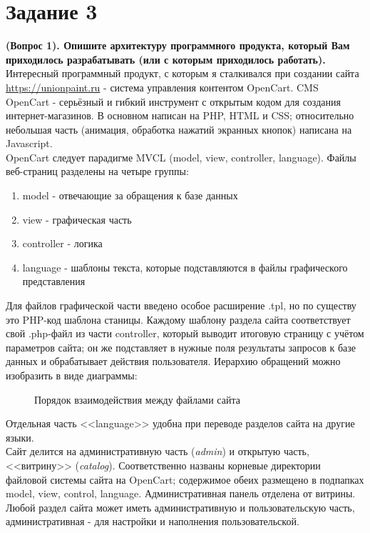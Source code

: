 \documentclass[a4paper,12pt]{article} %
\begin{document}
\section{Задание 3}
\textbf{(Вопрос 1). Опишите архитектуру программного продукта, который Вам приходилось разрабатывать (или с которым приходилось работать).}
Интересный программный продукт, с которым я сталкивался при создании сайта \url{https://unionpaint.ru} - система управления контентом OpenCart. CMS OpenCart - серьёзный и гибкий инструмент с открытым кодом для создания интернет-магазинов. В основном написан на PHP, HTML и CSS; относительно небольшая часть (анимация, обработка нажатий экранных кнопок) написана на Javascript.\\
OpenCart следует парадигме MVCL (model, view, controller, language). Файлы веб-страниц разделены на четыре группы:
\begin{enumerate}
	\item model - отвечающие за обращения к базе данных 
	\item view - графическая часть
	\item controller - логика
	\item language - шаблоны текста, которые подставляются в файлы графического представления
\end{enumerate}
Для файлов графической части введено особое расширение .tpl, но по существу это PHP-код шаблона станицы. Каждому шаблону раздела сайта соответствует свой .php-файл из части controller, который выводит итоговую страницу с учётом параметров сайта; он же подставляет в нужные поля результаты запросов к базе данных и обрабатывает действия пользователя. Иерархию обращений можно изобразить в виде диаграммы:\\
\begin{figure}[H]
	\caption{Порядок взаимодействия между файлами сайта}
	\label{hierarchy}
\end{figure}
Отдельная часть <<language>> удобна при переводе разделов сайта на другие языки.\\
Сайт делится на административную часть (\textit{admin}) и открытую часть, <<витрину>> (\textit{catalog}). Соответственно названы корневые директории файловой системы сайта на OpenCart; содержимое обеих размещено в подпапках model, view, control, language. Административная панель отделена от витрины. Любой раздел сайта может иметь административную и пользовательскую часть, административная - для настройки и наполнения пользовательской.\\
\end{document}
